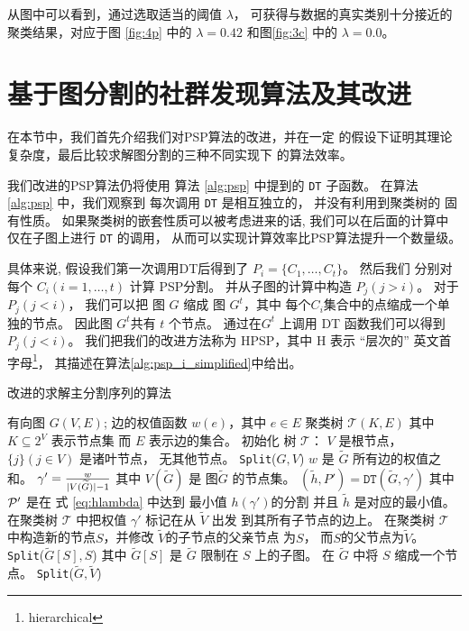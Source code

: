 从图中可以看到，通过选取适当的阈值 $\lambda$，
可获得与数据的真实类别十分接近的聚类结果，对应于图
\ref{fig:4p} 中的 $\lambda=0.42$
和图\ref{fig:3c} 中的 $\lambda=0.0$。

\section{基于图分割的社群发现算法及其改进}
在本节中，我们首先介绍我们对PSP算法的改进，并在一定
的假设下证明其理论复杂度，最后比较求解图分割的三种不同实现下
的算法效率。

我们改进的PSP算法仍将使用
算法 \ref{alg:psp} 中提到的
\texttt{DT} 子函数。
在算法\ref{alg:psp} 中，我们观察到
每次调用 \texttt{DT} 是相互独立的，
并没有利用到聚类树的 固有性质。
如果聚类树的嵌套性质可以被考虑进来的话, 
我们可以在后面的计算中
仅在子图上进行 \texttt{DT} 的调用，
从而可以实现计算效率比PSP算法提升一个数量级。


具体来说,
假设我们第一次调用DT后得到了
$P_i = \{C_1, \dots, C_t\}$。
然后我们 分别对每个
$C_i(i=1,\dots, t)$
计算 PSP分割。
并从子图的计算中构造 $P_j(j>i)$。
对于 $P_j(j<i)$，
我们可以把 图 $G$
缩成 图 $G^t$，其中 每个$C_i$集合中的点缩成一个单独的节点。
因此图 $G^t$共有 $t$ 个节点。
通过在$G^t$ 上调用 DT 函数我们可以得到  $P_j(j<i)$。
我们把我们的改进方法称为 HPSP，其中 H 表示 “层次的”
英文首字母\footnote{hierarchical}，
其描述在算法\ref{alg:psp_i_simplified}中给出。

\begin{algorithm}
	\caption{改进的求解主分割序列的算法}\label{alg:psp_i_simplified}
	\begin{algorithmic}[1]
		\REQUIRE 有向图 $G(V, E)$; 边的权值函数 $w(e)$，其中 $e\in E$
		\ENSURE 聚类树 $\mathcal{T}(K, E)$ 其中 $K \subseteq 2^{V}$ 表示节点集
    而 $E$ 表示边的集合。
		\STATE 初始化 树 $\mathcal{T}$：
     $V$ 是根节点，
     $\{j\}(j \in V)$ 是诸叶节点，
     无其他节点。
		\STATE \texttt{Split}($G, V$)
		\STATE $w$ 是 $\widetilde{G}$ 所有边的权值之和。
		\STATE $\gamma' = \frac{w}{\abs{V(\widetilde{G})}-1}$
    其中 $V(\widetilde{G})$ 是 图$\widetilde{G}$
    的节点集。
    \label{alg:gamma_apostrophe}
		\STATE $(\tilde{h}, P') = \texttt{DT}(\widetilde{G}, \gamma')$ 其中
    $\P'$ 是在 式 \eqref{eq:hlambda} 中达到
    最小值 $h(\gamma')$的分割
    并且 $\tilde{h}$ 是对应的最小值。 \label{line:DT}
		\STATE 在聚类树
    $\mathcal{T}$ 中把权值 $\gamma'$ 标记在从 $\widetilde{V}$ 出发
    到其所有子节点的边上。
		\ELSE
		\STATE 在聚类树
    $\mathcal{T}$ 中构造新的节点$S$，并修改 $\widetilde{V}$的子节点的父亲节点 为$S$，
    而$S$的父节点为$\widetilde{V}$。
		\STATE \texttt{Split}($\widetilde{G}[S], S$)
    其中 $\widetilde{G}[S]$ 是 $\widetilde{G}$ 限制在 $S$
    上的子图。\label{line:SplitDown}
		\STATE 在 $\widetilde{G}$ 中将 $S$ 缩成一个节点。 %
		\ENDFOR 
		\STATE \texttt{Split}($\widetilde{G}, \widetilde{V}$)		\label{line:SplitUp}
		\ENDIF
		\ENDFUNCTION
	\end{algorithmic}
\end{algorithm}

